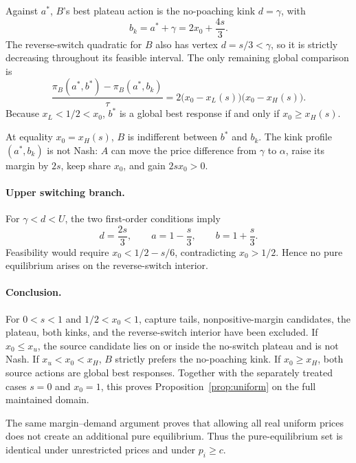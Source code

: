 Against \(a^*\), \(B\)'s best plateau action is the no-poaching kink \(d=\gamma\), with
\[
b_k=a^*+\gamma=2x_0+\frac{4s}{3}.
\]
The reverse-switch quadratic for \(B\) also has vertex \(d=s/3<\gamma\), so it is strictly decreasing throughout its feasible interval. The only remaining global comparison is
\[
\frac{\pi_B(a^*,b^*)-\pi_B(a^*,b_k)}{\tau}
=
2\bigl(x_0-x_L(s)\bigr)\bigl(x_0-x_H(s)\bigr).
\]
Because \(x_L<1/2<x_0\), \(b^*\) is a global best response if and only if \(x_0\ge x_H(s)\).

At equality \(x_0=x_H(s)\), \(B\) is indifferent between \(b^*\) and \(b_k\). The kink profile \((a^*,b_k)\) is not Nash: \(A\) can move the price difference from \(\gamma\) to \(\alpha\), raise its margin by \(2s\), keep share \(x_0\), and gain \(2sx_0>0\).

\paragraph{Upper switching branch.}
For \(\gamma<d<U\), the two first-order conditions imply
\[
d=\frac{2s}{3},\qquad
a=1-\frac{s}{3},\qquad
b=1+\frac{s}{3}.
\]
Feasibility would require \(x_0<1/2-s/6\), contradicting \(x_0>1/2\). Hence no pure equilibrium arises on the reverse-switch interior.

\paragraph{Conclusion.}
For \(0<s<1\) and \(1/2<x_0<1\), capture tails, nonpositive-margin candidates, the plateau, both kinks, and the reverse-switch interior have been excluded. If \(x_0\le x_u\), the source candidate lies on or inside the no-switch plateau and is not Nash. If \(x_u<x_0<x_H\), \(B\) strictly prefers the no-poaching kink. If \(x_0\ge x_H\), both source actions are global best responses. Together with the separately treated cases \(s=0\) and \(x_0=1\), this proves Proposition~\ref{prop:uniform} on the full maintained domain.

The same margin--demand argument proves that allowing all real uniform prices does not create an additional pure equilibrium. Thus the pure-equilibrium set is identical under unrestricted prices and under \(p_i\ge c\).
